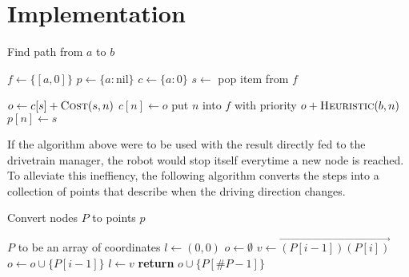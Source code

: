 \documentclass{article}
\begin{document}
\section{Implementation}


\begin{algorithm}
    \caption{Find path from $a$ to $b$}
    \begin{algorithmic}[1]
            \State $f \gets \{[a, 0]\}$ 
            \State $p \gets \{a: \mathrm{nil}\}$ 
            \State $c \gets \{a: 0\}$ 
                \State $s \gets $ pop item from $f$ 

                    \State \Return {} 
                \EndIf

                 
                    \State $o \gets c[s]+\Call{Cost}{s,n}$ 
                     
                        \State $c[n] \gets o$
                        \State put $n$ into $f$ with priority $o+\Call{Heuristic}{b,n}$
                        \State $p[n] \gets s$
                    \EndIf
                \EndFor
            \EndWhile
        \EndProcedure
    \end{algorithmic}
\end{algorithm}

If the algorithm above were to be used with the result directly fed to the drivetrain manager, the robot would stop itself everytime a new node is reached. To alleviate this ineffiency, the following algorithm converts the steps into a collection of points that describe when the driving direction changes.

\begin{algorithm}
	\caption{Convert nodes $P$ to points $p$}
	\begin{algorithmic}[1]
		\Require $P$ to be an array of coordinates
			\State $l \gets (0,0)$ 
			\State $o \gets \emptyset$ 
			\For{$i$ \textbf{in} $[1,\#P)$} 
				\State $v \gets \overrightarrow{(P[i-1])(P[i])}$ 
					\State $o \gets o \cup \{P[i-1]\}$
					\State $l \gets v$
				\EndIf
			\EndFor
			\State \textbf{return} $o \cup \{P[\#P-1]\}$
		\EndProcedure
	\end{algorithmic}
\end{algorithm}
\end{document}
